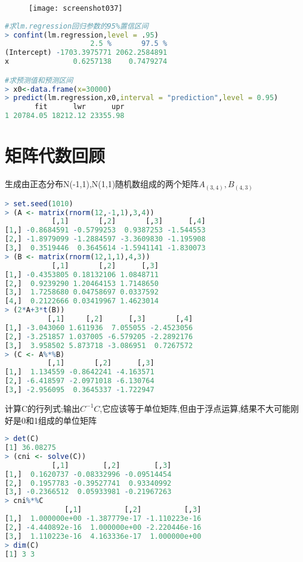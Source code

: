 \documentclass[11pt,a4paper,oneside]{book}
\begin{document}
\begin{figure}[H]
	\centering
	\texttt{[image: screenshot037]}
\end{figure}
\begin{lstlisting}[language=r]
#求lm.regression回归参数的95%置信区间
> confint(lm.regression,level = .95)  
                    2.5 %       97.5 %
(Intercept) -1703.3975771 2062.2584891
x               0.6257138    0.7479274

#求预测值和预测区间
> x0<-data.frame(x=30000)
> predict(lm.regression,x0,interval = "prediction",level = 0.95)
       fit      lwr      upr
1 20784.05 18212.12 23355.98
\end{lstlisting}
\section{矩阵代数回顾}
生成由正态分布N(-1,1),N(1,1)随机数组成的两个矩阵$ A_{(3,4)},B_{(4,3)} $
\begin{lstlisting}[language=r]
> set.seed(1010)
> (A <- matrix(rnorm(12,-1,1),3,4))
           [,1]       [,2]       [,3]      [,4]
[1,] -0.8684591 -0.5799253  0.9387253 -1.544553
[2,] -1.8979099 -1.2884597 -3.3609830 -1.195908
[3,]  0.3519446  0.3645614 -1.5941141 -1.830073
> (B <- matrix(rnorm(12,1,1),4,3))
           [,1]       [,2]      [,3]
[1,] -0.4353805 0.18132106 1.0848711
[2,]  0.9239290 1.20464153 1.7148650
[3,]  1.7258680 0.04758697 0.0337592
[4,]  0.2122666 0.03419967 1.4623014
> (2*A+3*t(B))
          [,1]     [,2]      [,3]       [,4]
[1,] -3.043060 1.611936  7.055055 -2.4523056
[2,] -3.251857 1.037005 -6.579205 -2.2892176
[3,]  3.958502 5.873718 -3.086951  0.7267572
> (C <- A%*%B)
          [,1]       [,2]      [,3]
[1,]  1.134559 -0.8642241 -4.163571
[2,] -6.418597 -2.0971018 -6.130764
[3,] -2.956095  0.3645337 -1.722947
\end{lstlisting}

计算C的行列式;输出$ C^{-1}C $,它应该等于单位矩阵,但由于浮点运算,结果不大可能刚好是0和1组成的单位矩阵
\begin{lstlisting}[language=r]
> det(C)
[1] 36.08275
> (cni <- solve(C))
           [,1]        [,2]        [,3]
[1,]  0.1620737 -0.08332996 -0.09514454
[2,]  0.1957783 -0.39527741  0.93340992
[3,] -0.2366512  0.05933981 -0.21967263
> cni%*%C
              [,1]          [,2]          [,3]
[1,]  1.000000e+00 -1.387779e-17 -1.110223e-16
[2,] -4.440892e-16  1.000000e+00 -2.220446e-16
[3,]  1.110223e-16  4.163336e-17  1.000000e+00
> dim(C)
[1] 3 3
\end{lstlisting}
\end{document}

